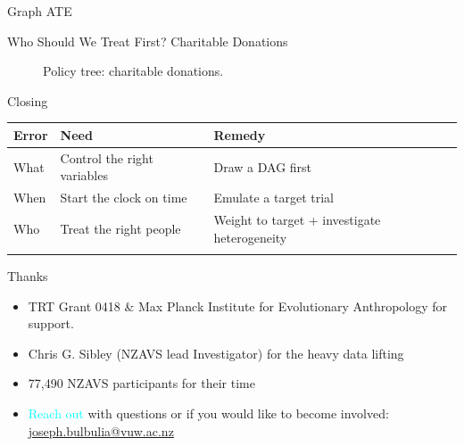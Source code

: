 \documentclass[
  ignorenonframetext,
  aspectratio=169,
]{beamer}
\providecommand{\tightlist}{%
  \setlength{\itemsep}{0pt}\setlength{\parskip}{0pt}}
\begin{document}
\begin{frame}[fragile]{Graph ATE}
\begin{block}{Who Should We Treat First? Charitable Donations}
\begin{figure}

\caption{\label{fig-policy-charity}Policy tree: charitable donations.}

\end{figure}%
\end{block}

\begin{block}{Closing}
\label{closing}
\begin{longtable}[]{@{}
  >{\raggedright\arraybackslash}p{}
  >{\raggedright\arraybackslash}p{}
  >{\raggedright\arraybackslash}p{}@{}}
\toprule\noalign{}
\begin{minipage}[b]{\linewidth}\raggedright
\textbf{Error}
\end{minipage} & \begin{minipage}[b]{\linewidth}\raggedright
\textbf{Need}
\end{minipage} & \begin{minipage}[b]{\linewidth}\raggedright
\textbf{Remedy}
\end{minipage} \\
\midrule\noalign{}
\endhead
What & Control the right variables & Draw a DAG first \\
When & Start the clock on time & Emulate a target trial \\
Who & Treat the right people & Weight to target + investigate
heterogeneity \\
\bottomrule\noalign{}
\end{longtable}
\end{block}

\begin{block}{Thanks}
\label{thanks}
\begin{itemize}
\tightlist
\item
  TRT Grant 0418 \& Max Planck Institute for Evolutionary Anthropology
  for support.
\item
  Chris G. Sibley (NZAVS lead Investigator) for the heavy data lifting
\item
  77,490 NZAVS participants for their time
\item
  \textcolor{cyan}{Reach out} with questions or if you would like to
  become involved:
  \href{emailto:joseph.bulbulia@vuw.ac.nz}{joseph.bulbulia@vuw.ac.nz}
\end{itemize}
\end{block}
\end{frame}
\end{document}
